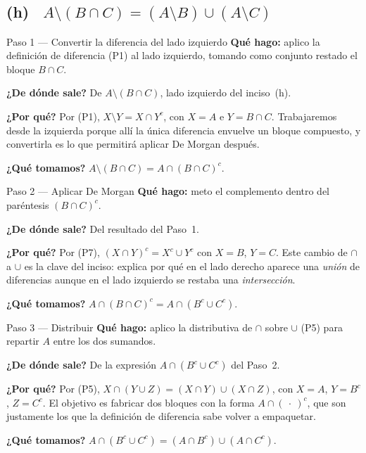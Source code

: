 \documentclass[11pt]{article}
\begin{document}
\subsection*{(h) \ $A\setminus(B\cap C)=(A\setminus B)\cup(A\setminus C)$}

\begin{paso}{Paso 1 --- Convertir la diferencia del lado izquierdo}
\textbf{Qué hago:} aplico la definición de diferencia (P1) al lado izquierdo, tomando como
conjunto restado el bloque $B\cap C$.

\textbf{¿De dónde sale?} De $A\setminus(B\cap C)$, lado izquierdo del inciso~(h).

\textbf{¿Por qué?} Por (P1), $X\setminus Y=X\cap Y^{c}$, con $X=A$ e $Y=B\cap C$. Trabajaremos
desde la izquierda porque allí la única diferencia envuelve un bloque compuesto, y convertirla
es lo que permitirá aplicar De Morgan después.

\textbf{¿Qué tomamos?} $A\setminus(B\cap C)=A\cap(B\cap C)^{c}$.
\end{paso}

\begin{paso}{Paso 2 --- Aplicar De Morgan}
\textbf{Qué hago:} meto el complemento dentro del paréntesis $(B\cap C)^{c}$.

\textbf{¿De dónde sale?} Del resultado del Paso~1.

\textbf{¿Por qué?} Por (P7), $(X\cap Y)^{c}=X^{c}\cup Y^{c}$ con $X=B$, $Y=C$. Este cambio de
$\cap$ a $\cup$ es la clave del inciso: explica por qué en el lado derecho aparece una
\emph{unión} de diferencias aunque en el lado izquierdo se restaba una \emph{intersección}.

\textbf{¿Qué tomamos?} $A\cap(B\cap C)^{c}=A\cap(B^{c}\cup C^{c})$.
\end{paso}

\begin{paso}{Paso 3 --- Distribuir}
\textbf{Qué hago:} aplico la distributiva de $\cap$ sobre $\cup$ (P5) para repartir $A$ entre los
dos sumandos.

\textbf{¿De dónde sale?} De la expresión $A\cap(B^{c}\cup C^{c})$ del Paso~2.

\textbf{¿Por qué?} Por (P5), $X\cap(Y\cup Z)=(X\cap Y)\cup(X\cap Z)$, con $X=A$, $Y=B^{c}$,
$Z=C^{c}$. El objetivo es fabricar dos bloques con la forma $A\cap(\ \cdot\ )^{c}$, que son
justamente los que la definición de diferencia sabe volver a empaquetar.

\textbf{¿Qué tomamos?} $A\cap(B^{c}\cup C^{c})=(A\cap B^{c})\cup(A\cap C^{c})$.
\end{paso}
\end{document}
